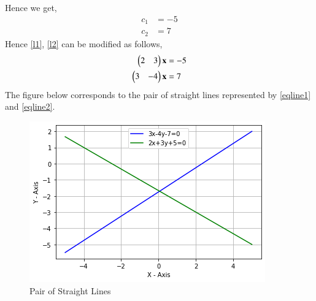 \documentclass[journal,12pt,twocolumn]{IEEEtran}
\begin{document}
Hence we get,
\begin{align}
    c_1&=-5\\
    c_2&=7
\end{align}
Hence \eqref{l1}, \eqref{l2} can be modified as follows,
\begin{align}
    \begin{pmatrix}2 & 3\end{pmatrix}\mathbf{x}&=-5\label{eqline1}\\
    \begin{pmatrix}3 & -4\end{pmatrix}\mathbf{x}&=7\label{eqline2}
\end{align}
The figure below corresponds to the pair of straight lines represented by \eqref{eqline1} and \eqref{eqline2}.
\renewcommand{\thefigure}{1}
\begin{figure}[h!]
\centering
\includegraphics[width = \columnwidth]{Lines.png}
\caption{Pair of Straight Lines}
\label{fig:my_label}
\end{figure}
\end{document}
